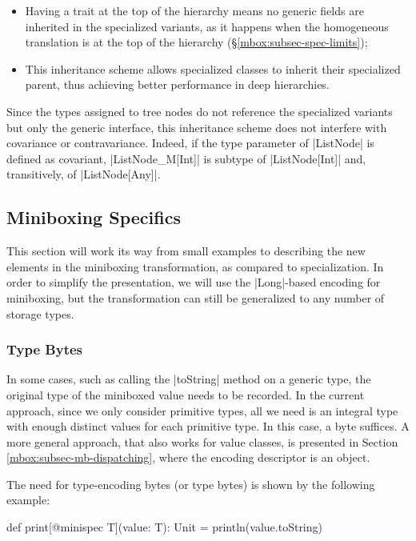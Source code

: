 \begin{itemize}
 \item Having a trait at the top of the hierarchy means no generic fields are inherited in the specialized variants, as it happens when the homogeneous translation is at the top of the hierarchy (\S\ref{mbox:subsec-spec-limits});
 \item This inheritance scheme allows specialized classes to inherit their specialized parent, thus achieving better performance in deep hierarchies.
\end{itemize}

Since the types assigned to tree nodes do not reference the specialized variants but only the generic interface, this inheritance scheme does not interfere with covariance or contravariance. Indeed, if the type parameter of |ListNode| is defined as covariant, |ListNode_M[Int]| is subtype of |ListNode[Int]| and, transitively, of |ListNode[Any]|.

\subsection{Miniboxing Specifics}

This section will work its way from small examples to describing the new elements in the miniboxing transformation, as compared to specialization. In order to simplify the presentation, we will use the |Long|-based encoding for miniboxing, but the transformation can still be generalized to any number of storage types.

\subsubsection*{Type Bytes}
\label{mbox:sec-mb-traf-type-bytes}

In some cases, such as calling the |toString| method on a generic type, the original type of the miniboxed value needs to be recorded. In the current approach, since we only consider primitive types, all we need is an integral type with enough distinct values for each primitive type. In this case, a byte suffices. A more general approach, that also works for value classes, is presented in Section \ref{mbox:subsec-mb-dispatching}, where the encoding descriptor is an object.

The need for type-encoding bytes (or type bytes) is shown by the following example:

\begin{lstlisting-nobreak}
 def print[@minispec T](value: T): Unit = println(value.toString)
\end{lstlisting-nobreak}

